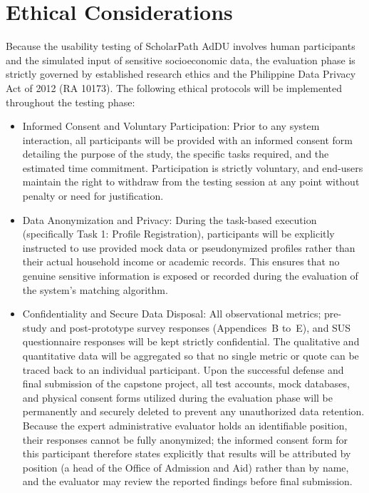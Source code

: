 \section{Ethical Considerations}

Because the usability testing of ScholarPath AdDU involves human participants and the simulated input of sensitive socioeconomic data, the evaluation phase is strictly governed by established research ethics and the Philippine Data Privacy Act of 2012 (RA 10173). The following ethical protocols will be implemented throughout the testing phase:

\begin{itemize}
  \item Informed Consent and Voluntary Participation: Prior to any system interaction, all participants will be provided with an informed consent form detailing the purpose of the study, the specific tasks required, and the estimated time commitment. Participation is strictly voluntary, and end-users maintain the right to withdraw from the testing session at any point without penalty or need for justification.
  \item Data Anonymization and Privacy: During the task-based execution (specifically Task 1: Profile Registration), participants will be explicitly instructed to use provided mock data or pseudonymized profiles rather than their actual household income or academic records. This ensures that no genuine sensitive information is exposed or recorded during the evaluation of the system's matching algorithm.
  \item Confidentiality and Secure Data Disposal: All observational metrics; pre-study and post-prototype survey responses (Appendices~B to~E), and SUS questionnaire responses will be kept strictly confidential. The qualitative and quantitative data will be aggregated so that no single metric or quote can be traced back to an individual participant. Upon the successful defense and final submission of the capstone project, all test accounts, mock databases, and physical consent forms utilized during the evaluation phase will be permanently and securely deleted to prevent any unauthorized data retention. Because the expert administrative evaluator holds an identifiable position, their responses cannot be fully anonymized; the informed consent form for this participant therefore states explicitly that results will be attributed by position (a head of the Office of Admission and Aid) rather than by name, and the evaluator may review the reported findings before final submission.
\end{itemize}

